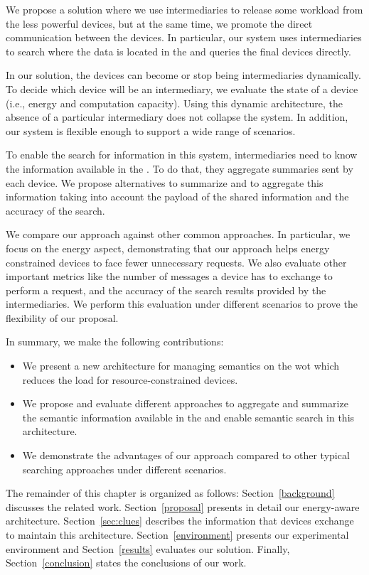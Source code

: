 We propose a solution where we use intermediaries to release some workload from the less powerful devices, but at the same time, we promote the direct communication between the devices.
In particular, our system uses intermediaries to search where the data is located in the \Space{} and queries the final devices directly.

In our solution, the devices can become or stop being intermediaries dynamically.
To decide which device will be an intermediary, we evaluate the state of a device (i.e., energy and computation capacity).
Using this dynamic architecture, the absence of a particular intermediary does not collapse the system.
In addition, our system is flexible enough to support a wide range of scenarios.

To enable the search for information in this system, intermediaries need to know the information available in the \Space{}.
To do that, they aggregate summaries sent by each device.
We propose alternatives to summarize and to aggregate this information taking into account the payload of the shared information and the accuracy of the search.

We compare our approach against other common approaches.
In particular, we focus on the energy aspect, demonstrating that our approach helps energy constrained devices to face fewer unnecessary requests.
We also evaluate other important metrics like the number of messages a device has to exchange to perform a request, and the accuracy of the search results provided by the intermediaries.
We perform this evaluation under different scenarios to prove the flexibility of our proposal.

In summary, we make the following contributions:
\begin{itemize}
\item We present a new architecture for managing semantics on the \ac{wot} which reduces the load for resource-constrained devices.
\item We propose and evaluate different approaches to aggregate and summarize the semantic information available in the \Space{} and enable semantic search in this architecture.
\item We demonstrate the advantages of our approach compared to other typical searching approaches under different scenarios.
\end{itemize}

The remainder of this chapter is organized as follows:
Section~\ref{background} discusses the related work.
Section~\ref{proposal} presents in detail our energy-aware architecture.
Section~\ref{sec:clues} describes the information that devices exchange to maintain this architecture.
Section~\ref{environment} presents our experimental environment and Section~\ref{results} evaluates our solution.
Finally, Section~\ref{conclusion} states the conclusions of our work.